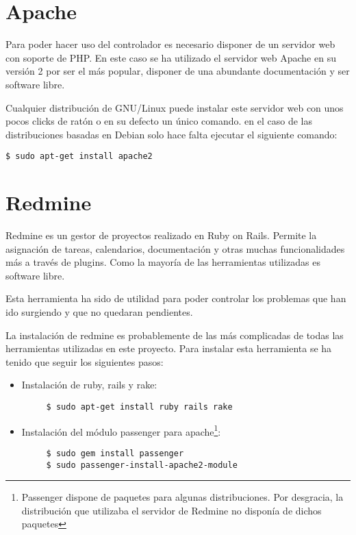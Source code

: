 \section{Apache}

Para poder hacer uso del controlador es necesario disponer de un servidor web con soporte de PHP. En este caso se ha utilizado el servidor web Apache en su versión 2 por ser el más popular, disponer de una abundante documentación y ser software libre.

Cualquier distribución de GNU/Linux puede instalar este servidor web con unos pocos clicks de ratón o en su defecto un único comando. en el caso de las distribuciones basadas en Debian solo hace falta ejecutar el siguiente comando:

\begin{verbatim}
$ sudo apt-get install apache2
\end{verbatim}

\section{Redmine}

Redmine es un gestor de proyectos realizado en Ruby on Rails. Permite la asignación de tareas, calendarios, documentación y otras muchas funcionalidades más a través de plugins. Como la mayoría de las herramientas utilizadas es software libre.

Esta herramienta ha sido de utilidad para poder controlar los problemas que han ido surgiendo y que no quedaran pendientes.

La instalación de redmine es probablemente de las más complicadas de todas las herramientas utilizadas en este proyecto. Para instalar esta herramienta se ha tenido que seguir los siguientes pasos:

\begin{itemize}
	 \item Instalación de ruby, rails y rake:
	 \begin{verbatim}
	 $ sudo apt-get install ruby rails rake
	 \end{verbatim}
	 
	 \item Instalación del módulo passenger para apache\footnote{Passenger dispone de paquetes para algunas distribuciones. Por desgracia, la distribución que utilizaba el servidor de Redmine no disponía de dichos paquetes}:
	 \begin{verbatim}
	 $ sudo gem install passenger
	 $ sudo passenger-install-apache2-module
	 \end{verbatim}
\end{itemize}

